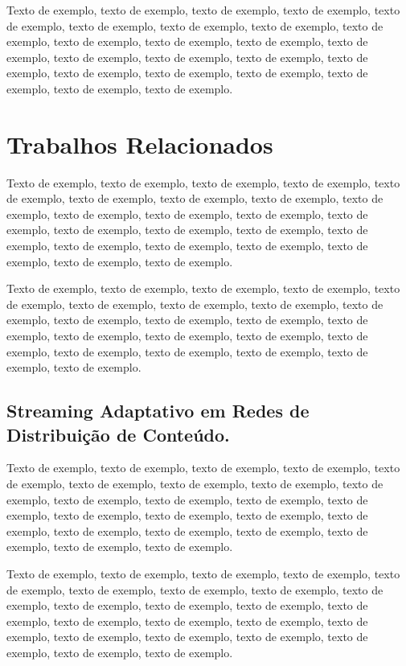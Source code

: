 \documentclass[
	12pt,				%
	oneside,			%
	a4paper,			%
	english,			%
	brazil				%
	]{abntex2ppgsi}
\begin{document}
Texto de exemplo, texto de exemplo, texto de exemplo, texto de exemplo, texto de exemplo, texto de exemplo, texto de exemplo, texto de exemplo, texto de exemplo, texto de exemplo, texto de exemplo, texto de exemplo, texto de exemplo, texto de exemplo, texto de exemplo, texto de exemplo, texto de exemplo, texto de exemplo, texto de exemplo, texto de exemplo, texto de exemplo, texto de exemplo, texto de exemplo.




\chapter{Trabalhos Relacionados}

Texto de exemplo, texto de exemplo, texto de exemplo, texto de exemplo, texto de exemplo, texto de exemplo, texto de exemplo, texto de exemplo, texto de exemplo, texto de exemplo, texto de exemplo, texto de exemplo, texto de exemplo, texto de exemplo, texto de exemplo, texto de exemplo, texto de exemplo, texto de exemplo, texto de exemplo, texto de exemplo, texto de exemplo, texto de exemplo, texto de exemplo.

Texto de exemplo, texto de exemplo, texto de exemplo, texto de exemplo, texto de exemplo, texto de exemplo, texto de exemplo, texto de exemplo, texto de exemplo, texto de exemplo, texto de exemplo, texto de exemplo, texto de exemplo, texto de exemplo, texto de exemplo, texto de exemplo, texto de exemplo, texto de exemplo, texto de exemplo, texto de exemplo, texto de exemplo, texto de exemplo.

\section{Streaming Adaptativo em Redes de Distribuição de Conteúdo.}

Texto de exemplo, texto de exemplo, texto de exemplo, texto de exemplo, texto de exemplo, texto de exemplo, texto de exemplo, texto de exemplo, texto de exemplo, texto de exemplo, texto de exemplo, texto de exemplo, texto de exemplo, texto de exemplo, texto de exemplo, texto de exemplo, texto de exemplo, texto de exemplo, texto de exemplo, texto de exemplo, texto de exemplo, texto de exemplo, texto de exemplo.

Texto de exemplo, texto de exemplo, texto de exemplo, texto de exemplo, texto de exemplo, texto de exemplo, texto de exemplo, texto de exemplo, texto de exemplo, texto de exemplo, texto de exemplo, texto de exemplo, texto de exemplo, texto de exemplo, texto de exemplo, texto de exemplo, texto de exemplo, texto de exemplo, texto de exemplo, texto de exemplo, texto de exemplo, texto de exemplo, texto de exemplo.
\end{document}
